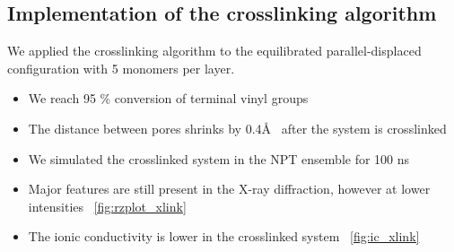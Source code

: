 \documentclass{article}
\newcommand{\angstrom}{\textup{\AA}}
\begin{document}
  \subsection*{Implementation of the crosslinking algorithm}

  We applied the crosslinking algorithm to the equilibrated parallel-displaced  
  configuration with 5 monomers per layer.
  \begin{itemize}  %
	\item We reach 95 \% conversion of terminal vinyl groups %
	\item The distance between pores shrinks by 0.4\angstrom~ after the system is 
	crosslinked  
	\item We simulated the crosslinked system in the NPT ensemble for 100 ns
	\item Major features are still present in the X-ray diffraction, however at lower intensities ~\ref{fig:rzplot_xlink} 
	\item The ionic conductivity is lower in the crosslinked system ~\ref{fig:ic_xlink} %
  \end{itemize}
 
\end{document}
